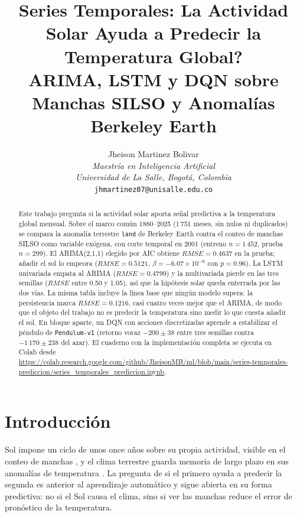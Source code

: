 \documentclass[10pt,journal]{IEEEtran}
\newcommand{\enlacenb}{\url{https://colab.research.google.com/github/JheisonMB/ml/blob/main/series-temporales-prediccion/series_temporales_prediccion.ipynb}}
\begin{document}
  \title{Series Temporales: \textquestiondown{}La Actividad Solar Ayuda a Predecir la Temperatura Global?\\ ARIMA, LSTM y DQN sobre Manchas SILSO y Anomal\'ias Berkeley Earth}

  \author{
    Jheison Martinez Bolivar\\
    \textit{Maestr\'ia en Inteligencia Artificial}\\
    \textit{Universidad de La Salle, Bogot\'a, Colombia}\\
    \texttt{jhmartinez07@unisalle.edu.co}
  }
  \maketitle

  \begin{abstract}
    Este trabajo pregunta si la actividad solar aporta se\~nal predictiva a la temperatura global mensual. Sobre el marco com\'un 1880--2025 (1\,751 meses, sin nulos ni duplicados) se compara la anomal\'ia terrestre \texttt{land} de Berkeley Earth contra el conteo de manchas SILSO como variable ex\'ogena, con corte temporal en 2001 (entreno $n=1\,452$, prueba $n=299$). El ARIMA(2,1,1) elegido por AIC obtiene $RMSE=0.4637$ en la prueba; a\~nadir el sol lo empeora ($RMSE=0.5121$, $\beta=-6.07\times10^{-6}$ con $p=0.96$). La LSTM univariada empata al ARIMA ($RMSE=0.4799$) y la multivariada pierde en las tres semillas ($RMSE$ entre 0.50 y 1.05), as\'i que la hip\'otesis solar queda enterrada por las dos v\'ias. La misma tabla incluye la l\'inea base que ning\'un modelo supera: la persistencia marca $RMSE=0.1216$, casi cuatro veces mejor que el ARIMA, de modo que el objeto del trabajo no es predecir la temperatura sino medir lo que cuesta a\~nadir el sol. En bloque aparte, un DQN con acciones discretizadas aprende a estabilizar el p\'endulo de \texttt{Pendulum-v1} (retorno voraz $-200\pm38$ entre tres semillas contra $-1\,170\pm238$ del azar). El cuaderno con la implementaci\'on completa se ejecuta en Colab desde \enlacenb.
  \end{abstract}

  \section{Introducci\'on}

   Sol impone un ciclo de unos once a\~nos sobre su propia actividad, visible en el conteo de manchas \cite{hathaway2015}, y el clima terrestre guarda memoria de largo plazo en sus anomal\'ias de temperatura \cite{silso2025,berkeleyearth2024}. La pregunta de si el primero ayuda a predecir la segunda es anterior al aprendizaje autom\'atico y sigue abierta en su forma predictiva: no si el Sol causa el clima, sino si ver las manchas reduce el error de pron\'ostico de la temperatura.
\end{document}

